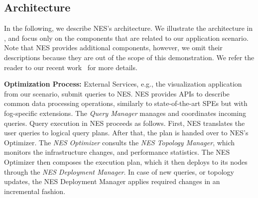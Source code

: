 
\subsection{Architecture} 
\label{nes_arch}
In the following, we describe NES's architecture. 
We illustrate the architecture in , and focus only on the components that are related to our application scenario. 
Note that NES provides additional components, however, we omit their descriptions because they are out of the scope of this demonstration. 
We refer the reader to our recent work~\cite{nes} for more details.

\textbf{Optimization Process:} 
External Services, e.g., the visualization application from our scenario, submit queries to NES. NES provides APIs to describe common data processing operations, similarly to state-of-the-art SPEs but with fog-specific extensions. 
The \textit{Query Manager} manages and coordinates incoming queries. 
Query execution in NES proceeds as follows. 
First, NES translates the user queries to logical query plans. 
After that, the plan is handed over to NES's Optimizer. 
The \textit{NES Optimizer} consults the \textit{NES Topology Manager}, which monitors the infrastructure changes, and performance statistics. 
The NES Optimizer then composes the execution plan, which it then deploys to its nodes through the \textit{NES Deployment Manager}.
In case of new queries, or topology updates, the NES Deployment Manager applies required changes in an incremental fashion.

